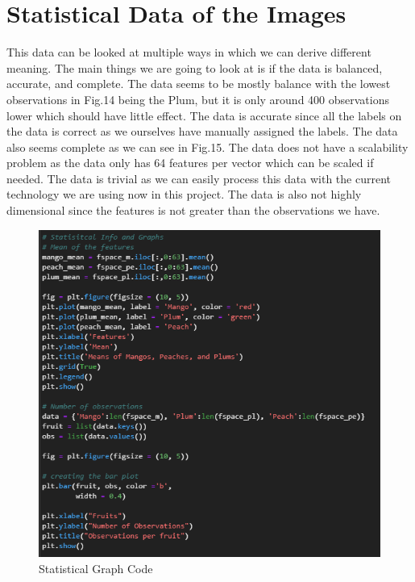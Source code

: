 \documentclass[conference]{IEEEtran}
\begin{document}
\section{Statistical Data of the Images}
This data can be looked at multiple ways in which we can derive different meaning. The main things we are going to look at is if the data is balanced, accurate, and complete. The data seems to be mostly balance with the lowest observations in Fig.14 being the Plum, but it is only around 400 observations lower which should have little effect. The data is accurate since all the labels on the data is correct as we ourselves have manually assigned the labels. The data also seems complete as we can see in Fig.15. The data does not have a scalability problem as the data only has 64 features per vector which can be scaled if needed. The data is trivial as we can easily process this data with the current technology we are using now in this project. The data is also not highly dimensional since the features is not greater than the observations we have.

\begin{figure}[h]
  \centering
  \includegraphics[width=\linewidth]{line&barplot.png}
  \caption{Statistical Graph Code}
\end{figure}
\end{document}
